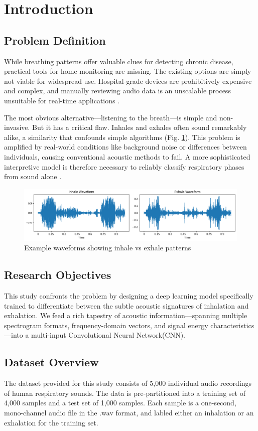 \section{Introduction}

\subsection{Problem Definition}

While breathing patterns offer valuable clues for detecting chronic disease, practical tools for home monitoring are missing. The existing options are simply not viable for widespread use. Hospital-grade devices are prohibitively expensive and complex, and manually reviewing audio data is an unscalable process unsuitable for real-time applications \cite{lee2025co2sensor}.

The most obvious alternative---listening to the breath---is simple and non-invasive. But it has a critical flaw. Inhales and exhales often sound remarkably alike, a similarity that confounds simple algorithms (Fig. \ref{fig:sample_waveform}). This problem is amplified by real-world conditions like background noise or differences between individuals, causing conventional acoustic methods to fail. A more sophisticated interpretive model is therefore necessary to reliably classify respiratory phases from sound alone \cite{lee2023wheezing}.

\begin{figure}[h!]
    \centering
    \includegraphics[width=\columnwidth]{figures/sample_waveform}	
    \caption{Example waveforms showing inhale vs exhale patterns}
    \label{fig:sample_waveform}
\end{figure}

\subsection{Research Objectives}

This study confronts the problem by designing a deep learning model specifically trained to differentiate between the subtle acoustic signatures of inhalation and exhalation. We feed a rich tapestry of acoustic information---spanning multiple spectrogram formats, frequency-domain vectors, and signal energy characteristics---into a multi-input Convolutional Neural Network(CNN).

\subsection{Dataset Overview}

The dataset provided for this study consists of 5,000 individual audio recordings of human respiratory sounds. The data is pre-partitioned into a training set of 4,000 samples and a test set of 1,000 samples. Each sample is a one-second, mono-channel audio file in the .wav format, and labled either an inhalation or an exhalation for the training set.

